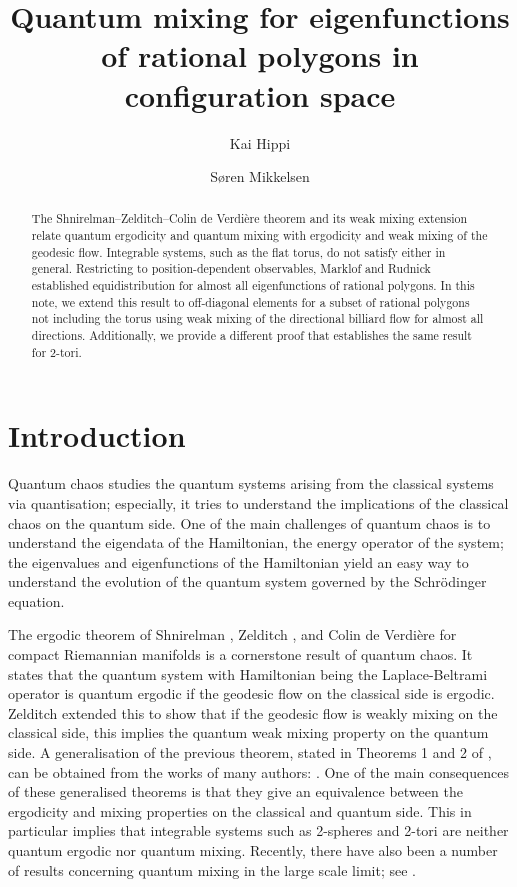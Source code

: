 \documentclass[11pt,twoside,reqno]{amsart}
\title{Quantum mixing for eigenfunctions of rational polygons in configuration space}
\author{Kai Hippi}
\author{S{\o}ren Mikkelsen}
\newcommand{\1}{\mathrm{\mathbf{1}}}
\numberwithin{equation}{section}
\theoremstyle{plain}
\theoremstyle{definition}
\theoremstyle{remark}
\begin{document}
\begin{abstract}
The Shnirelman–Zelditch–Colin de Verdi\`ere theorem and its weak mixing extension relate quantum ergodicity and quantum mixing with ergodicity and weak mixing of the geodesic flow. Integrable systems, such as the flat torus, do not satisfy either in general. Restricting to position-dependent observables, Marklof and Rudnick established equidistribution for almost all eigenfunctions of rational polygons. In this note, we extend this result to off-diagonal elements for a subset of rational polygons not including the torus using weak mixing of the directional billiard flow for almost all directions. Additionally, we provide a different proof that establishes the same result for $2$-tori.
\end{abstract}

\maketitle

\section{Introduction}


Quantum chaos studies the quantum systems arising from the classical systems via quantisation; especially, it tries to understand the implications of the classical chaos on the quantum side. One of the main challenges of quantum chaos is to understand the eigendata of the Hamiltonian, the energy operator of the system; the eigenvalues and eigenfunctions of the Hamiltonian yield an easy way to understand the evolution of the quantum system governed by the Schrödinger equation. 

The ergodic theorem of Shnirelman \cite{shnirelmanErgodicPropertiesEigenfunctions}, Zelditch \cite{zelditchUniformDistributionEigenfunctions1987}, and Colin de Verdi\`ere \cite{colindeverdiereErgodiciteFonctionsPropres1985} for compact Riemannian manifolds is a cornerstone result of quantum chaos. It states that the quantum system with Hamiltonian being the Laplace-Beltrami operator is quantum ergodic if the geodesic flow on the classical side is ergodic. Zelditch \cite{Zel96a} extended this to show that if the geodesic flow is weakly mixing on the classical side, this implies the quantum weak mixing property on the quantum side. A generalisation of the previous theorem, stated in Theorems 1 and 2 of \cite{Zel05}, can be obtained from the works of many authors: \cite{Shn74, colindeverdiereErgodiciteFonctionsPropres1985, zelditchUniformDistributionEigenfunctions1987, Zel90, GL93, LS93, Zel96b, Zel96a, ZZ96, Sun97}. One of the main consequences of these generalised theorems is that they give an equivalence between the ergodicity and mixing properties on the classical and quantum side. This in particular implies that integrable systems such as 2-spheres and 2-tori are neither quantum ergodic nor quantum mixing. Recently, there have also been a number of results concerning quantum mixing in the large scale limit; see \cite{Hippi,bordenave2026quantummixinglargeschreier,hippi2026quantummixingschrodingereigenfunctions}.  
\end{document}
